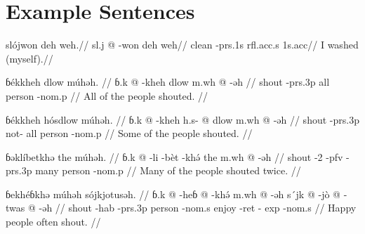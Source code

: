 \section{Example Sentences}

\ex
\begingl
\glpreamble slójwon deh weh.//
\gla sl.j @ -won deh weh//
\glb clean -{\sc prs}.1s {\sc rfl}.{\sc acc}.s 1s.{\sc acc}//
\glft I washed (myself).//
\endgl
\xe

\pex
\a
\begingl
\glpreamble ɓékkheh dlow múhəh. //
\gla ɓ.k @ -kheh dlow m.wh @ -əh //
\glb shout -{\sc prs}.3p all person -{\sc nom}.p //
\glft All of the people shouted. //
\endgl

\a
\begingl
\glpreamble ɓékkheh hósdlow múhəh. //
\gla ɓ.k @ -kheh h.s- @ dlow m.wh @ -əh //
\glb shout -{\sc prs}.3p not- all person -{\sc nom}.p //
\glft Some of the people shouted. //
\endgl

\a
\begingl
\glpreamble ɓəklíbetkhə the múhəh. //
\gla ɓ.k @ -li -bèt -khə́ the m.wh @ -əh //
\glb shout -2 -{\sc pfv} -{\sc prs}.3p many person -{\sc nom}.p //
\glft Many of the people shouted twice. //
\endgl

\a
\begingl
\glpreamble ɓekhéɓkhə múhəh sójkjotusəh. //
\gla ɓ.k @ -heɓ @ -khə́ m.wh @ -əh s´jk @ -jò @ -twas @ -əh //
\glb shout -{\sc hab} -{\sc prs}.3p person -{\sc nom}.s enjoy -{\sc ret} -{\sc
exp} -{\sc nom}.s //
\glft Happy people often shout. //
\endgl
\xe

